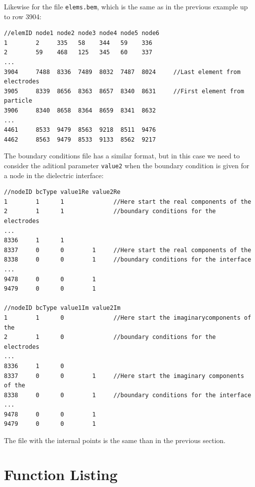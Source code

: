 \documentclass[12pt]{article}
\begin{document}
Likewise for the file \verb+elems.bem+, which is the same as in the previous example up to row 3904:

\small\begin{verbatim}
//elemID node1 node2 node3 node4 node5 node6
1        2     335   58    344   59    336
2        59    468   125   345   60    337
...
3904     7488  8336  7489  8032  7487  8024     //Last element from electrodes
3905     8339  8656  8363  8657  8340  8631     //First element from particle
3906     8340  8658  8364  8659  8341  8632
...
4461     8533  9479  8563  9218  8511  9476
4462     8563  9479  8533  9133  8562  9217
\end{verbatim}\normalsize

The boundary conditions file has a similar format, but in this case we need to consider the aditionl parameter \verb+value2+ when the boundary condition is given for a node in the dielectric interface:

\small\begin{verbatim}
//nodeID bcType value1Re value2Re
1        1      1              //Here start the real components of the
2        1      1              //boundary conditions for the electrodes
...
8336     1      1
8337     0      0        1     //Here start the real components of the
8338     0      0        1     //boundary conditions for the interface
...
9478     0      0        1
9479     0      0        1

//nodeID bcType value1Im value2Im
1        1      0              //Here start the imaginarycomponents of the
2        1      0              //boundary conditions for the electrodes
...
8336     1      0
8337     0      0        1     //Here start the imaginary components of the 
8338     0      0        1     //boundary conditions for the interface
...
9478     0      0        1
9479     0      0        1
\end{verbatim}\normalsize

The file with the internal points is the same than in the previous section.
\pagebreak

\appendix

\section{Function Listing}

\end{document}
